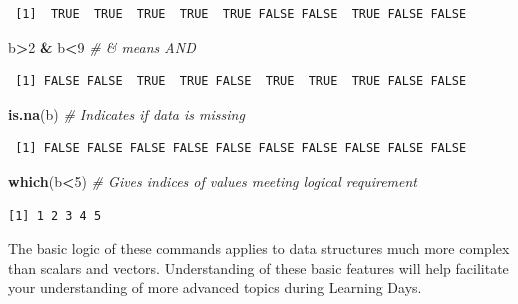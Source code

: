 \documentclass[12pt,]{book}
\newenvironment{Shaded}{\begin{snugshade}}{\end{snugshade}}
\newcommand{\CommentTok}[1]{\textcolor[rgb]{0.56,0.35,0.01}{\textit{#1}}}
\newcommand{\DecValTok}[1]{\textcolor[rgb]{0.00,0.00,0.81}{#1}}
\newcommand{\KeywordTok}[1]{\textcolor[rgb]{0.13,0.29,0.53}{\textbf{#1}}}
\newcommand{\NormalTok}[1]{#1}
\newcommand{\OperatorTok}[1]{\textcolor[rgb]{0.81,0.36,0.00}{\textbf{#1}}}
\newcommand{\StringTok}[1]{\textcolor[rgb]{0.31,0.60,0.02}{#1}}
\begin{document}
\begin{verbatim}
 [1]  TRUE  TRUE  TRUE  TRUE  TRUE FALSE FALSE  TRUE FALSE FALSE
\end{verbatim}

\begin{Shaded}
\begin{Highlighting}[]
\NormalTok{b}\OperatorTok{>}\DecValTok{2} \OperatorTok{&}\StringTok{ }\NormalTok{b}\OperatorTok{<}\DecValTok{9}                  \CommentTok{# & means AND}
\end{Highlighting}
\end{Shaded}

\begin{verbatim}
 [1] FALSE FALSE  TRUE  TRUE FALSE  TRUE  TRUE  TRUE FALSE FALSE
\end{verbatim}

\begin{Shaded}
\begin{Highlighting}[]
\KeywordTok{is.na}\NormalTok{(b)                   }\CommentTok{# Indicates if data is missing}
\end{Highlighting}
\end{Shaded}

\begin{verbatim}
 [1] FALSE FALSE FALSE FALSE FALSE FALSE FALSE FALSE FALSE FALSE
\end{verbatim}

\begin{Shaded}
\begin{Highlighting}[]
\KeywordTok{which}\NormalTok{(b}\OperatorTok{<}\DecValTok{5}\NormalTok{)       }\CommentTok{# Gives indices of values meeting logical requirement}
\end{Highlighting}
\end{Shaded}

\begin{verbatim}
[1] 1 2 3 4 5
\end{verbatim}

The basic logic of these commands applies to data structures much more complex than scalars and vectors. Understanding of these basic features will help facilitate your understanding of more advanced topics during Learning Days.

\hypertarget{refs}{}

\printbibliography
\end{document}
